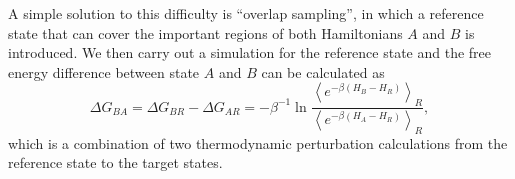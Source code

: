 A simple solution to this difficulty is ``overlap sampling'', in which a reference state that can cover the important regions of both Hamiltonians $A$ and $B$ is introduced.
We then carry out a simulation for the reference state and the free energy difference between state $A$ and $B$ can be calculated as
\begin{equation}
	\Delta G_{BA}=\Delta G_{BR}-\Delta G_{AR}=-\beta^{-1}\ln{\frac{\left<e^{-\beta\left(H_B-H_R\right)}\right>_R}{\left<e^{-\beta\left(H_A-H_R\right)}\right>_R}},
\end{equation} 
which is a combination of two thermodynamic perturbation calculations from the reference state to the target states.


